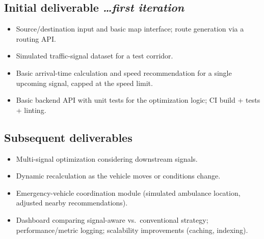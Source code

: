 \documentclass[11pt,a4paper]{article}
\newcommand{\BvrHint}[1]{%
  {\normalfont\normalsize\itshape\hfill #1}}
\begin{document}
\subsection{Initial deliverable %
\BvrHint{\ldots first iteration}}
\begin{itemize}[leftmargin=0.7cm]
    \item Source/destination input and basic map interface; route generation via a routing API.
    \item Simulated traffic-signal dataset for a test corridor.
    \item Basic arrival-time calculation and speed recommendation for a single upcoming signal, capped at the speed limit.
    \item Basic backend API with unit tests for the optimization logic; CI build + tests + linting.
\end{itemize}

\subsection{Subsequent deliverables}
\begin{itemize}[leftmargin=0.7cm]
    \item Multi-signal optimization considering downstream signals.
    \item Dynamic recalculation as the vehicle moves or conditions change.
    \item Emergency-vehicle coordination module (simulated ambulance location, adjusted nearby recommendations).
    \item Dashboard comparing signal-aware vs.\ conventional strategy; performance/metric logging; scalability improvements (caching, indexing).
\end{itemize}
\end{document}
